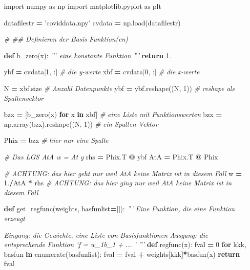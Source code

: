 \documentclass[]{book}
\newenvironment{Shaded}{\begin{snugshade}}{\end{snugshade}}
\newcommand{\BuiltInTok}[1]{#1}
\newcommand{\CommentTok}[1]{\textcolor[rgb]{0.56,0.35,0.01}{\textit{#1}}}
\newcommand{\ControlFlowTok}[1]{\textcolor[rgb]{0.13,0.29,0.53}{\textbf{#1}}}
\newcommand{\DecValTok}[1]{\textcolor[rgb]{0.00,0.00,0.81}{#1}}
\newcommand{\FloatTok}[1]{\textcolor[rgb]{0.00,0.00,0.81}{#1}}
\newcommand{\ImportTok}[1]{#1}
\newcommand{\KeywordTok}[1]{\textcolor[rgb]{0.13,0.29,0.53}{\textbf{#1}}}
\newcommand{\NormalTok}[1]{#1}
\newcommand{\OperatorTok}[1]{\textcolor[rgb]{0.81,0.36,0.00}{\textbf{#1}}}
\newcommand{\StringTok}[1]{\textcolor[rgb]{0.31,0.60,0.02}{#1}}
\theoremstyle{definition}
\theoremstyle{definition}
\theoremstyle{definition}
\theoremstyle{definition}
\theoremstyle{remark}
\begin{document}
\begin{Shaded}
\begin{Highlighting}[]
\ImportTok{import}\NormalTok{ numpy }\ImportTok{as}\NormalTok{ np}
\ImportTok{import}\NormalTok{ matplotlib.pyplot }\ImportTok{as}\NormalTok{ plt}

\NormalTok{datafilestr }\OperatorTok{=} \StringTok{'coviddata.npy'}
\NormalTok{cvdata }\OperatorTok{=}\NormalTok{ np.load(datafilestr)}

\CommentTok{# ## Definieren der Basis Funktion(en)}


\KeywordTok{def}\NormalTok{ b_zero(x):}
    \CommentTok{''' eine konstante Funktion '''}
    \ControlFlowTok{return} \FloatTok{1.}


\NormalTok{ybf }\OperatorTok{=}\NormalTok{ cvdata[}\DecValTok{1}\NormalTok{, :]  }\CommentTok{# die y-werte}
\NormalTok{xbf }\OperatorTok{=}\NormalTok{ cvdata[}\DecValTok{0}\NormalTok{, :]  }\CommentTok{# die x-werte}

\NormalTok{N }\OperatorTok{=}\NormalTok{ xbf.size   }\CommentTok{# Anzahl Datenpunkte}
\NormalTok{ybf }\OperatorTok{=}\NormalTok{ ybf.reshape((N, }\DecValTok{1}\NormalTok{))  }\CommentTok{# reshape als Spaltenvektor}

\NormalTok{bzx }\OperatorTok{=}\NormalTok{ [b_zero(x) }\ControlFlowTok{for}\NormalTok{ x }\KeywordTok{in}\NormalTok{ xbf]  }\CommentTok{# eine Liste mit Funktionswerten}
\NormalTok{bzx }\OperatorTok{=}\NormalTok{ np.array(bzx).reshape((N, }\DecValTok{1}\NormalTok{))  }\CommentTok{# ein Spalten Vektor}

\NormalTok{Phix }\OperatorTok{=}\NormalTok{ bzx  }\CommentTok{# hier nur eine Spalte}

\CommentTok{# Das LGS AtA w = At y}
\NormalTok{rhs }\OperatorTok{=}\NormalTok{ Phix.T }\OperatorTok{@}\NormalTok{ ybf}
\NormalTok{AtA }\OperatorTok{=}\NormalTok{ Phix.T }\OperatorTok{@}\NormalTok{ Phix}

\CommentTok{# ACHTUNG: das hier geht nur weil AtA keine Matrix ist in diesem Fall}
\NormalTok{w }\OperatorTok{=} \FloatTok{1.}\OperatorTok{/}\NormalTok{AtA }\OperatorTok{*}\NormalTok{ rhs}
\CommentTok{# ACHTUNG: das hier ging nur weil AtA keine Matrix ist in diesem Fall}


\KeywordTok{def}\NormalTok{ get_regfunc(weights, basfunlist}\OperatorTok{=}\NormalTok{[]):}
    \CommentTok{''' Eine Funktion, die eine Funktion erzeugt}

\CommentTok{    Eingang: die Gewichte, eine Liste von Basisfunktionen}
\CommentTok{    Ausgang: die entsprechende Funktion `f = w_1b_1 + ... `}
\CommentTok{    '''}
    \KeywordTok{def}\NormalTok{ regfunc(x):}
\NormalTok{        fval }\OperatorTok{=} \DecValTok{0}
        \ControlFlowTok{for}\NormalTok{ kkk, basfun }\KeywordTok{in} \BuiltInTok{enumerate}\NormalTok{(basfunlist):}
\NormalTok{            fval }\OperatorTok{=}\NormalTok{ fval }\OperatorTok{+}\NormalTok{ weights[kkk]}\OperatorTok{*}\NormalTok{basfun(x)}
        \ControlFlowTok{return}\NormalTok{ fval}


\end{Highlighting}
\end{Shaded}
\end{document}
